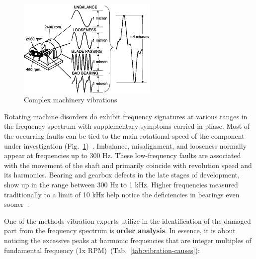 \begin{figure}[h]
	\centering
	\includegraphics[width=0.6\textwidth]{assets/complex-vibrations.png}
	\caption{Complex machinery vibrations~\cite{davies_handbook_2012}}
	\label{fig:machinery-vibrations}
\end{figure}

Rotating machine disorders do exhibit frequency signatures at various ranges in the frequency spectrum with supplementary symptoms carried in phase. Most of the occurring faults can be tied to the main rotational speed of the component under investigation (Fig.~\ref{fig:machinery-vibrations})~\cite{davies_handbook_2012}. Imbalance, misalignment, and looseness normally appear at frequencies up to 300 Hz. These low-frequency faults are associated with the movement of the shaft and primarily coincide with revolution speed and its harmonics. Bearing and gearbox defects in the late stages of development, show up in the range between 300 Hz to 1 kHz. Higher frequencies measured traditionally to a limit of 10 kHz help notice the deficiencies in bearings even sooner~\cite{torres_automatic_2022}.

One of the methods vibration experts utilize in the identification of the damaged part from the frequency spectrum is \textbf{order analysis}. In essence, it is about noticing the excessive peaks at harmonic frequencies that are integer multiples of fundamental frequency (1x RPM)~(Tab.~\ref{tab:vibration-causes}):

